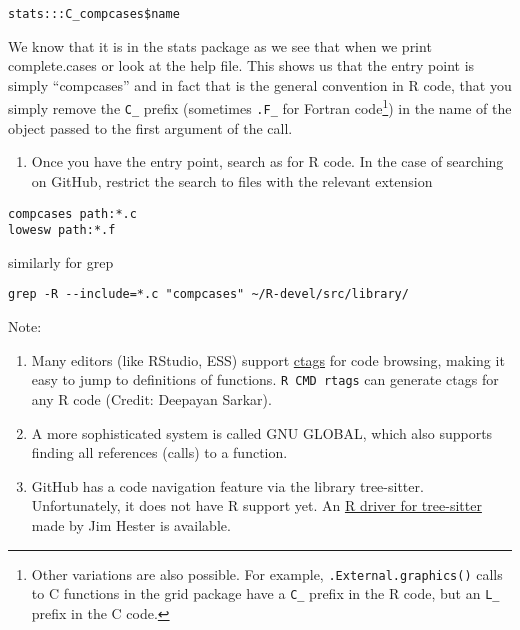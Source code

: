\documentclass[
  letterpaper,
  DIV=11,
  numbers=noendperiod]{scrreprt}
\providecommand{\tightlist}{%
  \setlength{\itemsep}{0pt}\setlength{\parskip}{0pt}}\usepackage{longtable,booktabs,array}
\begin{document}
\begin{verbatim}
stats:::C_compcases$name
\end{verbatim}

We know that it is in the stats package as we see that when we print
complete.cases or look at the help file. This shows us that the entry
point is simply ``compcases'' and in fact that is the general convention
in R code, that you simply remove the \texttt{C\_} prefix (sometimes
\texttt{.F\_} for Fortran code\footnote{Other variations are also
  possible. For example, \texttt{.External.graphics()} calls to C
  functions in the grid package have a \texttt{C\_} prefix in the R
  code, but an \texttt{L\_} prefix in the C code.}) in the name of the
object passed to the first argument of the call.

\begin{enumerate}
\def\labelenumi{\arabic{enumi}.}
\setcounter{enumi}{1}
\tightlist
\item
  Once you have the entry point, search as for R code. In the case of
  searching on GitHub, restrict the search to files with the relevant
  extension
\end{enumerate}

\begin{verbatim}
compcases path:*.c
lowesw path:*.f
\end{verbatim}

similarly for grep

\begin{verbatim}
grep -R --include=*.c "compcases" ~/R-devel/src/library/
\end{verbatim}

Note:

\begin{enumerate}
\def\labelenumi{\arabic{enumi}.}
\item
  Many editors (like RStudio, ESS) support
  \href{https://en.wikipedia.org/wiki/Ctags}{ctags} for code browsing,
  making it easy to jump to definitions of functions.
  \texttt{R\ CMD\ rtags} can generate ctags for any R code (Credit:
  Deepayan Sarkar).
\item
  A more sophisticated system is called GNU GLOBAL, which also supports
  finding all references (calls) to a function.
\item
  GitHub has a code navigation feature via the library tree-sitter.
  Unfortunately, it does not have R support yet. An
  \href{https://github.com/r-lib/tree-sitter-r}{R driver for
  tree-sitter} made by Jim Hester is available.
\end{enumerate}
\end{document}
